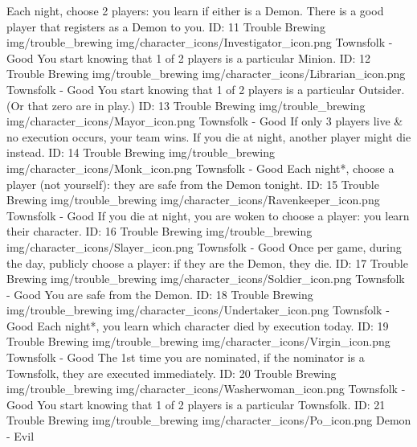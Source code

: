 	{Each night, choose 2 players: you learn if either is a Demon. There is a good player that registers as a Demon to you.}        
	{ID: 11}
	{Trouble Brewing}
	{img/trouble_brewing}
	{img/character_icons/Investigator_icon.png}
	{\color{goodcolor}Townsfolk - Good}
	{You start knowing that 1 of 2 players is a particular Minion.}        
	{ID: 12}
	{Trouble Brewing}
	{img/trouble_brewing}
	{img/character_icons/Librarian_icon.png}
	{\color{goodcolor}Townsfolk - Good}
	{You start knowing that 1 of 2 players is a particular Outsider. (Or that zero are in play.)}        
	{ID: 13}
	{Trouble Brewing}
	{img/trouble_brewing}
	{img/character_icons/Mayor_icon.png}
	{\color{goodcolor}Townsfolk - Good}
	{If only 3 players live \& no execution occurs, your team wins. If you die at night, another player might die instead.}        
	{ID: 14}
	{Trouble Brewing}
	{img/trouble_brewing}
	{img/character_icons/Monk_icon.png}
	{\color{goodcolor}Townsfolk - Good}
	{Each night*, choose a player (not yourself): they are safe from the Demon tonight.}        
	{ID: 15}
	{Trouble Brewing}
	{img/trouble_brewing}
	{img/character_icons/Ravenkeeper_icon.png}
	{\color{goodcolor}Townsfolk - Good}
	{If you die at night, you are woken to choose a player: you learn their character.}        
	{ID: 16}
	{Trouble Brewing}
	{img/trouble_brewing}
	{img/character_icons/Slayer_icon.png}
	{\color{goodcolor}Townsfolk - Good}
	{Once per game, during the day, publicly choose a player: if they are the Demon, they die.}        
	{ID: 17}
	{Trouble Brewing}
	{img/trouble_brewing}
	{img/character_icons/Soldier_icon.png}
	{\color{goodcolor}Townsfolk - Good}
	{You are safe from the Demon.}        
	{ID: 18}
	{Trouble Brewing}
	{img/trouble_brewing}
	{img/character_icons/Undertaker_icon.png}
	{\color{goodcolor}Townsfolk - Good}
	{Each night*, you learn which character died by execution today.}        
	{ID: 19}
	{Trouble Brewing}
	{img/trouble_brewing}
	{img/character_icons/Virgin_icon.png}
	{\color{goodcolor}Townsfolk - Good}
	{The 1st time you are nominated, if the nominator is a Townsfolk, they are executed immediately.}        
	{ID: 20}
	{Trouble Brewing}
	{img/trouble_brewing}
	{img/character_icons/Washerwoman_icon.png}
	{\color{goodcolor}Townsfolk - Good}
	{You start knowing that 1 of 2 players is a particular Townsfolk.}        
	{ID: 21}
	{Trouble Brewing}
	{img/trouble_brewing}
	{img/character_icons/Po_icon.png}
	{\color{evilcolor}Demon - Evil}
